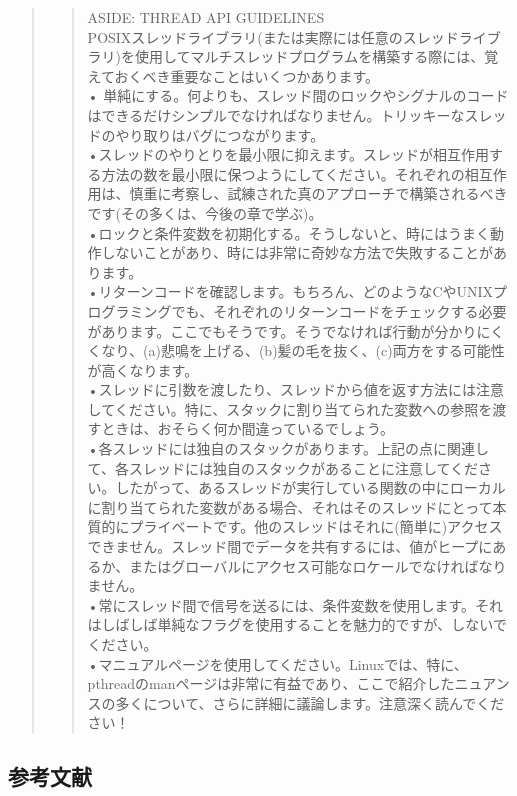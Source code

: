 \begin{quote}
\begin{quote}
ASIDE: THREAD API GUIDELINES\\
POSIXスレッドライブラリ(または実際には任意のスレッドライブラリ)を使用してマルチスレッドプログラムを構築する際には、覚えておくべき重要なことはいくつかあります。\\
•
単純にする。何よりも、スレッド間のロックやシグナルのコードはできるだけシンプルでなければなりません。トリッキーなスレッドのやり取りはバグにつながります。\\
•スレッドのやりとりを最小限に抑えます。スレッドが相互作用する方法の数を最小限に保つようにしてください。それぞれの相互作用は、慎重に考察し、試練された真のアプローチで構築されるべきです(その多くは、今後の章で学ぶ)。\\
•ロックと条件変数を初期化する。そうしないと、時にはうまく動作しないことがあり、時には非常に奇妙な方法で失敗することがあります。\\
•リターンコードを確認します。もちろん、どのようなCやUNIXプログラミングでも、それぞれのリターンコードをチェックする必要があります。ここでもそうです。そうでなければ\hspace{0pt}\hspace{0pt}行動が分かりにくくなり、(a)悲鳴を上げる、(b)髪の毛を抜く、(c)両方をする可能性が高くなります。\\
•スレッドに引数を渡したり、スレッドから値を返す方法には注意してください。特に、スタックに割り当てられた変数への参照を渡すときは、おそらく何か間違っているでしょう。\\
•各スレッドには独自のスタックがあります。上記の点に関連して、各スレッドには独自のスタックがあることに注意してください。したがって、あるスレッドが実行している関数の中にローカルに割り当てられた変数がある場合、それはそのスレッドにとって本質的にプライベートです。他のスレッドはそれに(簡単に)アクセスできません。スレッド間でデータを共有するには、値がヒープにあるか、またはグローバルにアクセス可能なロケールでなければなりません。\\
•常にスレッド間で信号を送るには、条件変数を使用します。それはしばしば単純なフラグを使用することを魅力的ですが、しないでください。\\
•マニュアルページを使用してください。Linuxでは、特に、pthreadのmanページは非常に有益であり、ここで紹介したニュアンスの多くについて、さらに詳細に議論します。注意深く読んでください！
\end{quote}
\end{quote}

\hypertarget{ux53c2ux8003ux6587ux732e-16}{%
\subsection*{参考文献}\label{ux53c2ux8003ux6587ux732e-16}}

